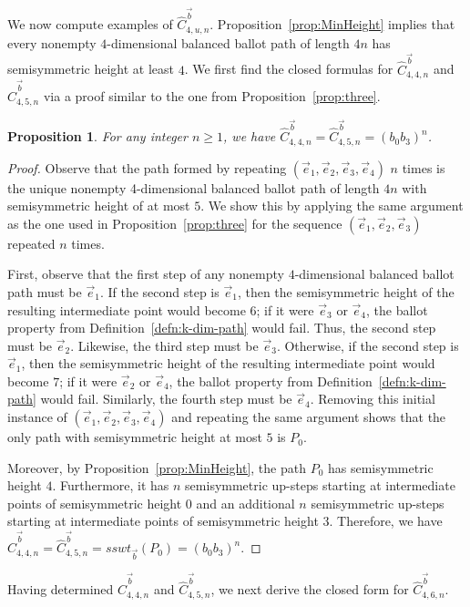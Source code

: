 \documentclass[11pt]{article}
\newtheorem{proposition}[theorem]{Proposition}
\theoremstyle{remark}
\theoremstyle{definition}
\begin{document}
We now compute examples of $\widehat{C}_{4, u, n}^{\vec{b}}$. Proposition~\ref{prop:MinHeight} implies that every nonempty $4$-dimensional balanced ballot path of length $4n$ has semisymmetric height at least $4$. We first find the closed formulas for $\widehat{C}_{4, 4, n}^{\vec{b}}$ and $\widehat{C}_{4, 5, n}^{\vec{b}}$ via a proof similar to the one from Proposition~\ref{prop:three}.
\begin{proposition}
    For any integer $n \geq 1$, we have $\widehat{C}_{4, 4, n}^{\vec{b}} = \widehat{C}_{4, 5, n}^{\vec{b}} = (b_0b_3)^n$.
\end{proposition}
\begin{proof}
    Observe that the path formed by repeating $(\vec{e}_1, \vec{e}_2, \vec{e}_3, \vec{e}_4)$ $n$ times is the unique nonempty 4-dimensional balanced ballot path of length $4n$ with semisymmetric height of at most $5$. We show this by applying the same argument as the one used in Proposition~\ref{prop:three} for the sequence $(\vec{e}_1, \vec{e}_2, \vec{e}_3)$ repeated $n$ times. 
    
    First, observe that the first step of any nonempty $4$-dimensional balanced ballot path must be $\vec {e}_{1} $. If the second step is $\vec{e}_1$, then the semisymmetric height of the resulting intermediate point would become $6$; if it were $\vec {e} _3$ or $\vec{e}_4$, the ballot property from Definition~\ref{defn:k-dim-path} would fail. Thus, the second step must be $\vec{e}_2$. Likewise, the third step must be $\vec {e}_3$. Otherwise, if the second step is $\vec{e}_1$, then the semisymmetric height of the resulting intermediate point would become $7$; if it were $\vec{e}_2$ or $\vec{e}_4$, the ballot property from Definition~\ref{defn:k-dim-path} would fail. Similarly, the fourth step must be $\vec{e}_4$. Removing this initial instance of $(\vec{e}_1, \vec{e}_2, \vec{e}_3, \vec{e}_4)$ and repeating the same argument shows that the only path with semisymmetric height at most $5$ is $P_0$.

Moreover, by Proposition~\ref{prop:MinHeight}, the path $P_0$ has semisymmetric height $4$. Furthermore, it has $n$ semisymmetric up-steps starting at intermediate points of semisymmetric height $0$ and an additional $n$ semisymmetric up-steps starting at intermediate points of semisymmetric height $3$. Therefore, we have $\widehat{C}_{4,4,n}^{\vec b}=\widehat{C}_{4,5,n}^{\vec b}=sswt_{\vec b}(P_0)=(b_0b_3)^n$.
\end{proof}

Having determined $\widehat{C}_{4,4,n}^{\vec b}$ and $\widehat{C}_{4,5,n}^{\vec b}$, we next derive the closed form for $\widehat{C}_{4,6,n}^{\vec b}$.
\end{document}
